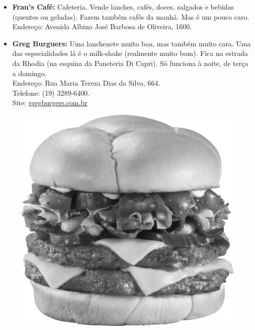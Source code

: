 \begin{itemize}
\item   \textbf{Fran's Café:} Cafeteria. Vende lanches, cafés, doces, salgados e
        bebidas (quentes ou geladas). Fazem também cafés da manhã. Mas é um
        pouco caro.
        \\Endereço: Avenida Albino José Barbosa de Oliveira, 1600.

\item   \textbf{Greg Burguers:} Uma lanchenete muito boa, mas também muito cara.
        Uma das especialidades lá é o milk-shake (realmente muito bom). Fica na
        estrada da Rhodia (na esquina da Paneteria Di Capri). Só funciona à
        noite, de terça a domingo.
        \\Endereço: Rua Maria Tereza Dias da Silva, 664.
        \\Telefone: (19) 3289-6400.
        \\Site: \url{gregburgers.com.br}
\end{itemize}
\begin{figure}[h!]
    \centering
    \includegraphics[scale=0.48,keepaspectratio=true]{img/imgs/6-comida/burger.jpg}
\end{figure}



